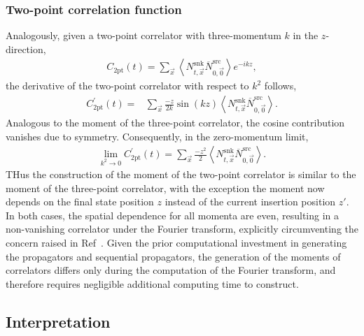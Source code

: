\documentclass[prd,aps,twocolumn,superscriptaddress,tightenlines,nofootinbib,floatfix,preprintnumbers,10pt]{revtex4-1}
\begin{document}
\subsubsection{Two-point correlation function}
Analogously, given a two-point correlator with three-momentum $k$ in the $z$-direction,
\begin{align}
C_{\text{2pt}}(t) = \sum_{\vec{x}} \left< N^{\mathrm{snk}}_{t,\vec{x}}\overline{N}^{\mathrm{src}}_{0,\vec{0}}\right> e^{-ikz},
\label{eq:2pt}
\end{align}
the derivative of the two-point correlator with respect to $k^2$ follows,
\begin{align}
C^\prime_{\text{2pt}}(t)
= & \sum_{\vec{x}}\frac{-z}{2k} \sin\left(kz\right) \left<N^{\mathrm{snk}}_{t, \vec{x}}\overline{N}^{\mathrm{src}}_{0,\vec{0}} \right>.
\label{eq:2ptmoment}
\end{align}
 Analogous to the moment of the three-point correlator, the cosine contribution vanishes due to symmetry.  Consequently, in the zero-momentum limit,
\begin{align}
\lim_{k^2\rightarrow 0 } C^\prime_{\text{2pt}}(t) = \sum_{\vec{x}} \frac{-z^2}{2}\left<N^{\mathrm{snk}}_{t, \vec{x}}\overline{N}^{\mathrm{src}}_{0,\vec{0}} \right>.
\label{eq:2ptmoment0}
\end{align}
THus the construction of the moment of the two-point correlator is similar
to the moment of the three-point correlator, with the exception
the moment now depends on the final state position $z$ instead of
the current insertion position $z'$. In both cases, the
spatial dependence for all momenta are even, resulting in a
non-vanishing correlator under the Fourier transform, explicitly
circumventing the concern raised in Ref~\cite{Wilcox:2002zt}.  Given
the prior computational investment in generating the propagators and
sequential propagators, the generation of the moments of correlators
differs only during the computation of the Fourier transform, and therefore requires
negligible additional computing time to construct.


\subsection{Interpretation}
\end{document}
